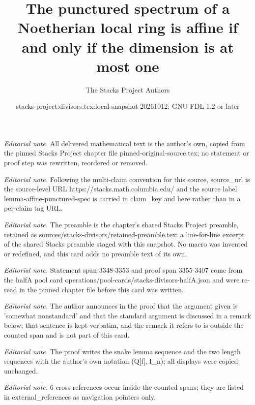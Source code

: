 \documentclass[10pt,a4paper]{amsart}
\title{The punctured spectrum of a Noetherian local ring is affine if and only if the dimension is at most one}
\author{The Stacks Project Authors}
\date{stacks-project:divisors.tex:local-snapshot-20261012; GNU FDL 1.2 or later}
\theoremstyle{plain}
\theoremstyle{definition}
\theoremstyle{remark}
\numberwithin{equation}{subsection}
\begin{document}
\maketitle
\noindent\textit{Editorial note.} All delivered mathematical text is the author's own, copied from the pinned Stacks Project chapter file pinned-original-source.tex; no statement or proof step was rewritten, reordered or removed.\par\medskip
\noindent\textit{Editorial note.} Following the multi-claim convention for this source, source\_url is the source-level URL https://stacks.math.columbia.edu/ and the source label lemma-affine-punctured-spec is carried in claim\_key and here rather than in a per-claim tag URL.\par\medskip
\noindent\textit{Editorial note.} The preamble is the chapter's shared Stacks Project preamble, retained as sources/stacks-divisors/retained-preamble.tex: a line-for-line excerpt of the shared Stacks preamble staged with this snapshot. No macro was invented or redefined, and this card adds no preamble text of its own.\par\medskip
\noindent\textit{Editorial note.} Statement span 3348-3353 and proof span 3355-3407 come from the halfA pool card operations/pool-cards/stacks-divisors-halfA.json and were re-read in the pinned chapter file before this card was written.\par\medskip
\noindent\textit{Editorial note.} The author announces in the proof that the argument given is 'somewhat nonstandard' and that the standard argument is discussed in a remark below; that sentence is kept verbatim, and the remark it refers to is outside the counted span and is not part of this card.\par\medskip
\noindent\textit{Editorial note.} The proof writes the snake lemma sequence and the two length sequences with the author's own notation (Q[f], l\_n); all displays were copied unchanged.\par\medskip
\noindent\textit{Editorial note.} 6 cross-references occur inside the counted spans; they are listed in external\_references as navigation pointers only.\par\medskip
\end{document}
